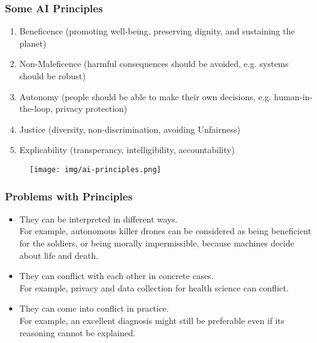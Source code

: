 \documentclass[UTF8,11pt,colorlinks,compress,openany]{beamer}%
\begin{document}
\begin{frame}\frametitle{Some AI Principles}
\begin{enumerate}
	\item Beneficence (promoting well-being, preserving dignity, and sustaining the planet)
	\item Non-Maleficence (harmful consequences should be avoided, e.g. systems should be robust)
	\item Autonomy (people should be able to make their own decisions, e.g. human-in-the-loop, privacy protection)
	\item Justice (diversity, non-discrimination, avoiding Unfairness)
	\item Explicability (transperancy, intelligibility, accountability)
\end{enumerate}
\begin{figure}[H]
\texttt{[image: img/ai-principles.png]}
\end{figure}
\end{frame}

\begin{frame}\frametitle{Problems with Principles}
\begin{itemize}
	\item They can be interpreted in different ways.\\
	For example, autonomous killer drones can be considered as being beneficient for the soldiers, or being morally impermissible, because machines decide about life and death.
	\item They can conflict with each other in concrete cases.\\
	For example, privacy and data collection for health science can conflict.
	\item They can come into conflict in practice.\\
	For example, an excellent diagnosis might still be preferable even if its reasoning cannot be explained.
\end{itemize}
\end{frame}
\end{document}
